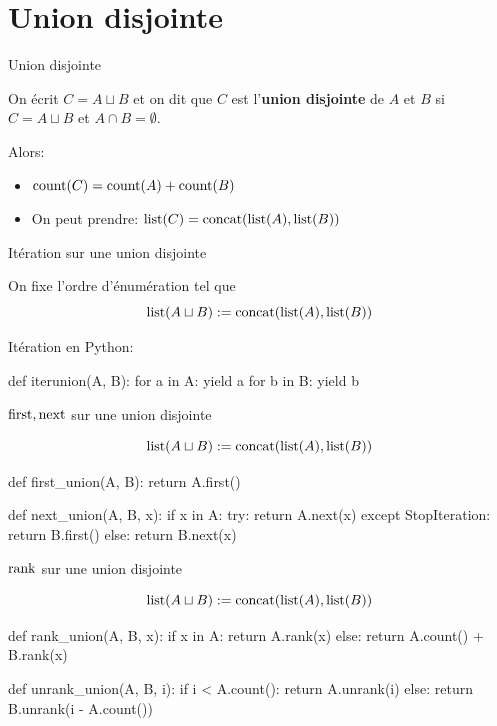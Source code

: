 \documentclass{beamer}
\begin{document}
\section{Union disjointe}
\begin{frame}{Union disjointe}

  \begin{definition}
    On écrit $C = A \sqcup B$ et on dit que $C$ est l'\textbf{union disjointe}
    de $A$ et $B$ si $C = A \sqcup B$ et $A \cap B = \emptyset$.
  \end{definition}
  \pause\bigskip

  Alors:
  \begin{itemize}
  \item $\operatorname{count}(C) = \operatorname{count}(A) + \operatorname{count}(B)$
  \item On peut prendre: $\operatorname{list}(C) = \operatorname{concat}(\operatorname{list}(A), \operatorname{list}(B))$
  \end{itemize}
\end{frame}

\begin{frame}[fragile]{Itération sur une union disjointe}

  On fixe l'ordre d'énumération tel que
  $$\operatorname{list}(A\sqcup B) := \operatorname{concat}(\operatorname{list}(A), \operatorname{list}(B))$$
  \bigskip

  Itération en Python:
\begin{listing}{1}
    def iterunion(A, B):
        for a in A:
            yield a
        for b in B:
            yield b
\end{listing}
\end{frame}

\begin{frame}[fragile]{$\operatorname{first}, \operatorname{next}$ sur une union disjointe}

  $$\operatorname{list}(A\sqcup B) := \operatorname{concat}(\operatorname{list}(A), \operatorname{list}(B))$$
\begin{listing}{1}
    def first_union(A, B):
        return A.first()

    def next_union(A, B, x):
        if x in A:
            try:
                return A.next(x)
            except StopIteration:
                return B.first()
        else:
            return B.next(x)
\end{listing}
\end{frame}


\begin{frame}[fragile]{$\operatorname{rank}$ sur une union disjointe}

  $$\operatorname{list}(A\sqcup B) := \operatorname{concat}(\operatorname{list}(A), \operatorname{list}(B))$$
\begin{listing}{1}
    def rank_union(A, B, x):
        if x in A:
            return A.rank(x)
        else:
            return A.count() + B.rank(x)

    def unrank_union(A, B, i):
        if i < A.count():
            return A.unrank(i)
        else:
            return B.unrank(i - A.count())
\end{listing}
\end{frame}
\end{document}
